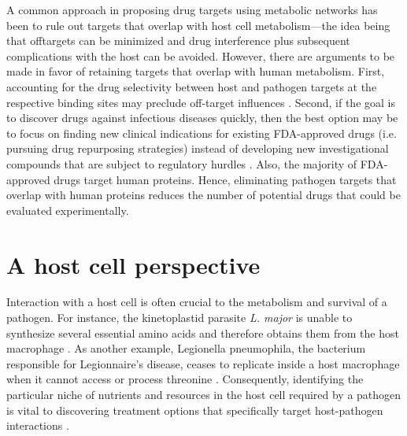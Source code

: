 A common approach in proposing drug targets using metabolic 
networks has been to rule out targets that overlap with host 
cell metabolism---the idea being that offtargets can be minimized 
and drug interference plus subsequent complications with the host 
can be avoided. However, there are arguments to be made in favor 
of retaining targets that overlap with human metabolism. First, 
accounting for the drug selectivity between host and pathogen 
targets at the respective binding sites may preclude off-target 
influences \cite{Hopkins:2008bb}. Second, if the goal is to discover drugs against 
infectious diseases quickly, then the best option may be to 
focus on finding new clinical indications for existing FDA-approved 
drugs (i.e. pursuing drug repurposing strategies) instead of 
developing new investigational compounds that are subject to 
regulatory hurdles \cite{Chong:2007dl}. Also, the majority of FDA-approved 
drugs target human proteins. Hence, eliminating pathogen 
targets that overlap with human proteins reduces the number 
of potential drugs that could be evaluated experimentally.

\section{A host cell perspective}
Interaction with a host cell is often crucial to the metabolism 
and survival of a pathogen. For instance, the kinetoplastid 
parasite \textit{L. major} is unable to synthesize several essential 
amino acids and therefore obtains them from the host macrophage \cite{McConville:2007df}. 
As another example, Legionella pneumophila, the bacterium 
responsible for Legionnaire's disease, ceases to replicate 
inside a host macrophage when it cannot access or process 
threonine \cite{Sauer:2005kf}. Consequently, identifying the particular 
niche of nutrients and resources in the host cell required 
by a pathogen is vital to discovering treatment options 
that specifically target host-pathogen interactions \cite{Brown:2008gm}.

